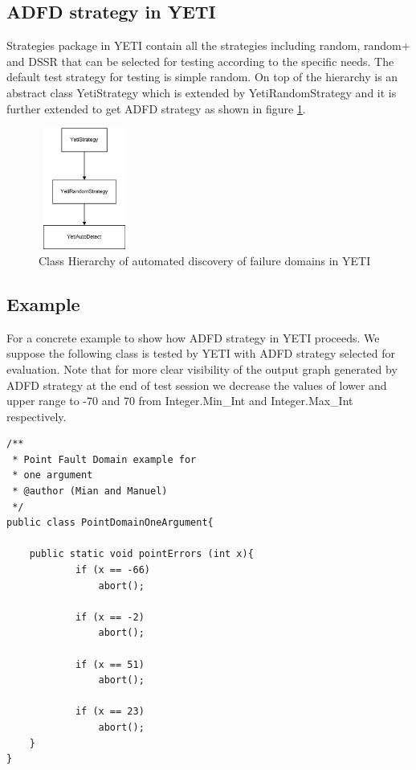 \documentclass{acm_proc_article-sp}
\begin{document}
 \subsection{ADFD strategy in YETI}
Strategies package in YETI contain all the strategies including random, random+ and DSSR that can be selected for testing according to the specific needs. The default test strategy for testing is simple random. On top of the hierarchy is an abstract class YetiStrategy which is extended by YetiRandomStrategy and it is further extended to get ADFD strategy as shown in figure \ref{fig:hierarchy}. 
 
\begin{figure}[htp]
\centering
\includegraphics[width=3cm,height=4cm]{Hierarchy1.png}
\caption{Class Hierarchy of automated discovery of failure domains in YETI}
\label{fig:hierarchy}
\end{figure}

\subsection{Example}\label{sec:example}
For a concrete example to show how ADFD strategy in YETI proceeds. We suppose the following class is tested by YETI with ADFD strategy selected for evaluation. Note that for more clear visibility of the output graph generated by ADFD strategy at the end of test session we decrease the values of lower and upper range to -70 and 70 from Integer.Min\_Int and Integer.Max\_Int respectively. 


\begin{lstlisting}
/**
 * Point Fault Domain example for 
 * one argument
 * @author (Mian and Manuel)
 */
public class PointDomainOneArgument{

	public static void pointErrors (int x){
     		if (x == -66)
       			abort();
     
     		if (x == -2)
     			abort();
      				
     		if (x == 51)
     			abort();
     
     		if (x == 23)
     			abort();
	}
}
\end{lstlisting}
\end{document}
